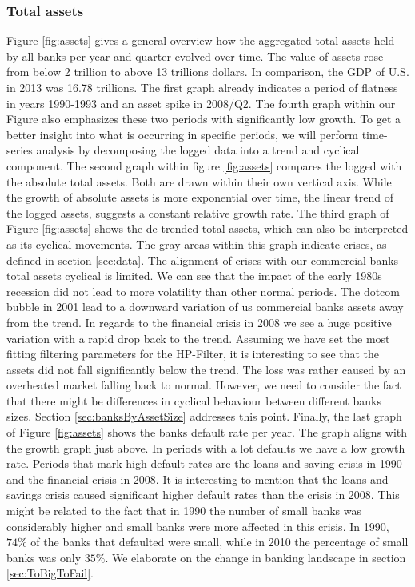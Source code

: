 \documentclass[12pt, a4paper]{article} %
\begin{document}
\subsubsection{Total assets}
 Figure \ref{fig:assets} gives a general overview how the aggregated total assets held by all banks per year and quarter evolved over time. The value of assets rose from below 2 trillion to above 13 trillions dollars. In comparison, the GDP of U.S. in 2013 was 16.78 trillions. The first graph already indicates a period of flatness in years 1990-1993 and an asset spike in 2008/Q2. The fourth graph within our Figure also emphasizes these two periods with significantly low growth.  To get a better insight into what is occurring in specific periods, we will perform time-series analysis by decomposing the logged data into a trend and cyclical component. The second graph within figure \ref{fig:assets} compares the logged with the absolute total assets. Both are drawn within their own vertical axis. While the growth of absolute assets is more exponential over time, the linear trend of the logged assets, suggests a constant relative growth rate. The third graph of Figure \ref{fig:assets} shows the de-trended total assets, which can also be interpreted as its cyclical movements. The gray areas within this graph indicate crises, as defined in section \ref{sec:data}. The alignment of crises with our commercial banks total assets cyclical is limited. We can see that the impact of the early 1980s recession did not lead to more volatility than other normal periods. The dotcom bubble in 2001 lead to a downward variation of us commercial banks assets away from the trend. In regards to the financial crisis in 2008 we see a huge positive variation with a rapid drop back to the trend. Assuming we have set the most fitting filtering parameters for the HP-Filter, it is interesting to see that the assets did not fall significantly below the trend. The loss was rather caused by an overheated market falling back to normal. However, we need to consider the fact that there might be differences in cyclical behaviour between different banks sizes. Section \ref{sec:banksByAssetSize} addresses this point. Finally, the last graph of Figure \ref{fig:assets} shows the banks default rate per year. The graph aligns with the growth graph just above. In periods with a lot defaults we have a low growth rate. Periods that mark high default rates are the loans and saving crisis in 1990 and the financial crisis in 2008. It is interesting to mention that the loans and savings crisis caused significant higher default rates than the crisis in 2008. This might be related to the fact that in 1990 the number of small banks was considerably higher and small banks were more affected in this crisis. In 1990, $74\%$ of the banks that defaulted were small, while in 2010 the percentage of small banks was only $35\%$. We elaborate on the change in banking landscape in section \ref{sec:ToBigToFail}.
 
\end{document}
